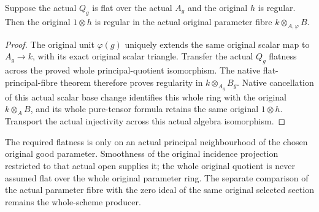 \begin{lemma}
\label{lem:kn-nadel-bertini-snc-flat-original-fibre}
\leanok
Suppose the actual $Q_g$ is flat over the actual $A_g$ and the original
$h$ is regular.  Then the original $1\otimes h$ is regular in the actual
original parameter fibre $k\otimes_{A,\varphi}B$.
\end{lemma}
\begin{proof}
The original unit $\varphi(g)$ uniquely extends the same original scalar
map to $A_g\to k$, with its exact original scalar triangle.  Transfer the
actual $Q_g$ flatness across the proved whole principal-quotient
isomorphism.  The native flat-principal-fibre theorem therefore proves
regularity in $k\otimes_{A_g}B_g$.  Native cancellation of this actual
scalar base change identifies this whole ring with the original
$k\otimes_A B$, and its whole pure-tensor formula retains the same
original $1\otimes h$.  Transport the actual injectivity across this
actual algebra isomorphism.
\end{proof}

The required flatness is only on an actual principal neighbourhood of the
chosen original good parameter.  Smoothness of the original incidence
projection restricted to that actual open supplies it; the whole original
quotient is never assumed flat over the whole original parameter ring.
The separate comparison of the actual parameter fibre with the zero ideal
of the same original selected section remains the whole-scheme producer.


